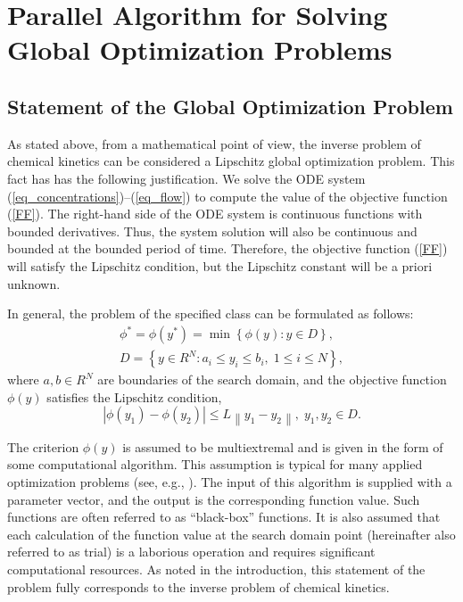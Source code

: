 \documentclass[mathematics,article,accept,pdftex,moreauthors]{Definitions/mdpi}
\begin{document}
	\section{Parallel Algorithm for Solving Global Optimization Problems }\label{sec_GSA}
	
	\subsection{Statement of the Global Optimization Problem}
	
	As stated above, from a mathematical point of view, the inverse problem of chemical kinetics can be considered a Lipschitz global optimization problem.
	{This fact has has the following justification.
		We solve the ODE system (\ref{eq_concentrations})--(\ref{eq_flow}) to compute the value of the objective function (\ref{FF}). The right-hand side of the ODE system is continuous functions with bounded derivatives. Thus, the system solution will also be continuous and bounded at the bounded period of time. Therefore, the objective function (\ref{FF}) will satisfy the Lipschitz condition, but the Lipschitz constant will be a priori unknown.}
	
	In general, the problem of the specified class can be formulated as follows:
	\begin{gather}
		\phi^* = \phi(y^\ast)=\min{\left\{\phi(y):y\in D\right\}}, \label{problemN}\\
		D=\left\{y\in R^N: a_i\leq y_i \leq b_i, \;  1\leq i \leq N\right\} \label{D},
	\end{gather}
	where $a,b \in R^N$ are boundaries of the search domain, and the objective function $\phi(y)$ satisfies the Lipschitz condition,
	\begin{equation}\label{Lip}
		\left|\phi(y_1)-\phi(y_2)\right|\leq L\left\|y_1-y_2\right\|,\; y_1,y_2 \in D.
	\end{equation}
	
	The criterion $\phi(y)$ is assumed to be multiextremal and is given in the form of some computational algorithm. 
	{This assumption is typical for many applied optimization problems (see, e.g., \cite{Kvasov2013,Kalyulin2017}).}
	The input of this algorithm is supplied with a parameter vector, and the output is the corresponding function value. Such functions are often referred to as ``black-box'' functions. It is also assumed that each calculation of the function value at the search domain point (hereinafter also referred to as trial) is a laborious operation and requires significant computational resources. As noted in the introduction, this statement of the problem fully corresponds to the inverse problem of chemical kinetics.
	
\end{document}

